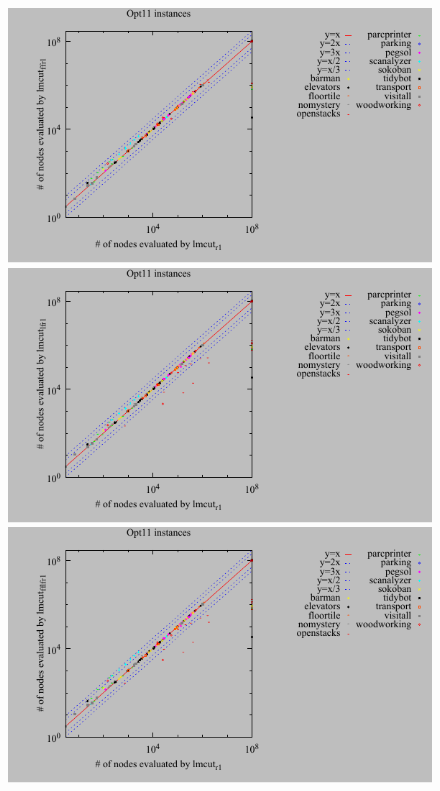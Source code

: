 \begin{figure}[htbp]
 \centering
 \includegraphics{tables/opt11-evaluated-lmcut_r-lmcut_ffr.pdf}
 \includegraphics{tables/opt11-evaluated-lmcut_r-lmcut_lfr.pdf}
 \includegraphics{tables/opt11-evaluated-lmcut_r-lmcut_fflfr.pdf}
 \caption{}
 \label{portfolio-r}
\end{figure}



